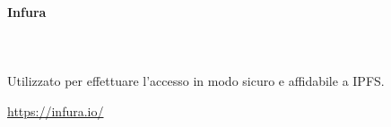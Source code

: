 \begin{itemize}
		\paragraph{Infura} \mbox{}\\ \mbox{}\\
		Utilizzato per effettuare l'accesso in modo sicuro e affidabile a IPFS\glo. \\
		\centerline{\url{https://infura.io/}}
		
%	
%	
%	

\end{itemize}
